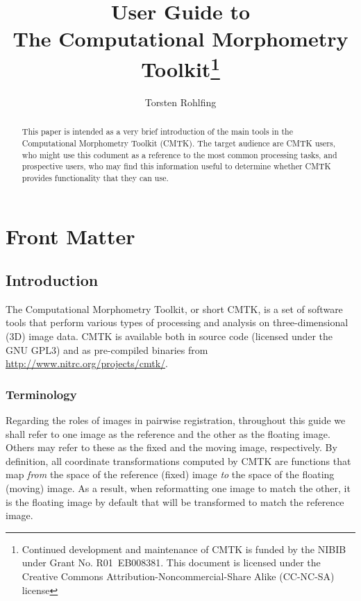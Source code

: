 \documentclass{InsightArticle}
\title{User Guide to \\[4mm] The Computational Morphometry
  Toolkit\footnote{Continued development and maintenance of CMTK is funded by
    the NIBIB under Grant No. R01~EB008381. This document is licensed under
    the Creative Commons Attribution-Noncommercial-Share Alike (CC-NC-SA) license}}
\author{Torsten Rohlfing}
\begin{document}
\ifpdf
\else
\fi


\maketitle


\ifhtml
\chapter*{Front Matter\label{front}}
\fi


\begin{abstract}
\noindent
This paper is intended as a very brief introduction of the main tools in the
Computational Morphometry Toolkit (CMTK). The target audience are CMTK users,
who might use this codument as a reference to the most common processing
tasks, and prospective users, who may find this information useful to
determine whether CMTK provides functionality that they can use.
\end{abstract}

\tableofcontents

\section{Introduction}

The Computational Morphometry Toolkit, or short CMTK, is a set of software
tools that perform various types of processing and analysis on
three-dimensional (3D) image data. CMTK is available both in source code
(licensed under the GNU GPL3) and as pre-compiled binaries from
\url{http://www.nitrc.org/projects/cmtk/}.

\subsection{Terminology}

Regarding the roles of images in pairwise registration, throughout this guide we shall
refer to one image as the reference and the other as the floating
image. Others may refer to these as the fixed and the moving image,
respectively. By definition, all coordinate transformations computed by CMTK
are functions that map {\em from\/} the space of the reference (fixed) image
{\em to\/} the space of the floating (moving) image. As a result, when
reformatting one image to match the other, it is the floating image by default
that will be transformed to match the reference image.
\end{document}
